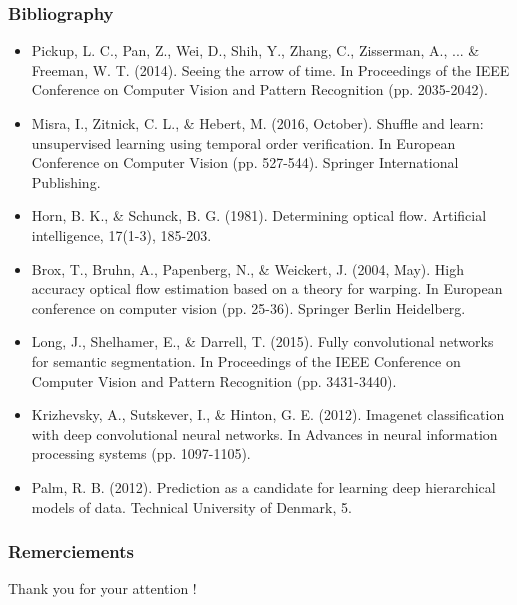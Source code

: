 \documentclass[french]{beamer}
\begin{document}
	\begin{frame}
		\frametitle{Bibliography}
		\scriptsize{
		\begin{itemize}
			
			\item Pickup, L. C., Pan, Z., Wei, D., Shih, Y., Zhang, C., Zisserman, A., ... \& Freeman, W. T. (2014). Seeing the arrow of time. In Proceedings of the IEEE Conference on Computer Vision and Pattern Recognition (pp. 2035-2042).
			
			\item Misra, I., Zitnick, C. L., \& Hebert, M. (2016, October). Shuffle and learn: unsupervised learning using temporal order verification. In European Conference on Computer Vision (pp. 527-544). Springer International Publishing.
			
			\item Horn, B. K., \& Schunck, B. G. (1981). Determining optical flow. Artificial intelligence, 17(1-3), 185-203.
			
			\item Brox, T., Bruhn, A., Papenberg, N., \& Weickert, J. (2004, May). High accuracy optical flow estimation based on a theory for warping. In European conference on computer vision (pp. 25-36). Springer Berlin Heidelberg.
			
			\item Long, J., Shelhamer, E., \& Darrell, T. (2015). Fully convolutional networks for semantic segmentation. In Proceedings of the IEEE Conference on Computer Vision and Pattern Recognition (pp. 3431-3440).
			
			\item Krizhevsky, A., Sutskever, I., \& Hinton, G. E. (2012). Imagenet classification with deep convolutional neural networks. In Advances in neural information processing systems (pp. 1097-1105).
			
			\item Palm, R. B. (2012). Prediction as a candidate for learning deep hierarchical models of data. Technical University of Denmark, 5.
			
		\end{itemize}
	}
	\end{frame}
	
	\begin{frame}
	\frametitle{Remerciements}
	
	Thank you for your attention !
	
	\end{frame}
\end{document}
